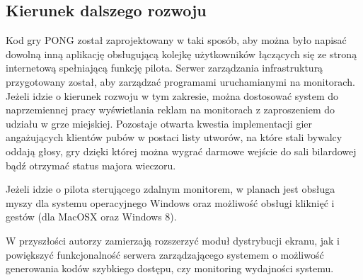 \subsection{Kierunek dalszego rozwoju}

Kod gry PONG został zaprojektowany w taki sposób, aby można było napisać dowolną inną aplikację obsługującą kolejkę użytkowników łączących się ze stroną internetową spełniającą funkcję pilota. Serwer zarządzania infrastrukturą przygotowany został, aby zarządzać programami uruchamianymi na monitorach. Jeżeli idzie o kierunek rozwoju w tym zakresie, można dostosować system do naprzemiennej pracy wyświetlania reklam na monitorach z zaproszeniem do udziału w grze miejskiej. Pozostaje otwarta kwestia implementacji gier angażujących klientów pubów w postaci listy utworów, na które stali bywalcy oddają głosy, gry dzięki której można wygrać darmowe wejście do sali bilardowej bądź otrzymać status majora wieczoru.

Jeżeli idzie o pilota sterującego zdalnym monitorem, w planach jest obsługa myszy dla systemu operacyjnego Windows oraz możliwość obsługi kliknięć i gestów (dla MacOSX oraz Windows 8).

W przyszłości autorzy zamierzają rozszerzyć moduł dystrybucji ekranu, jak i powiększyć funkcjonalność serwera zarządzającego systemem o możliwość generowania kodów szybkiego dostępu, czy monitoring wydajności systemu. 

